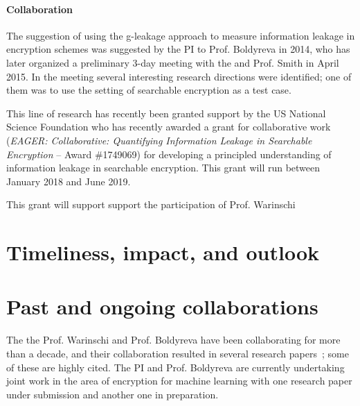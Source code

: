 \paragraph{Collaboration}
The suggestion of using the g-leakage approach to measure information leakage in encryption schemes was suggested by the PI to Prof. Boldyreva in 2014, who has later organized a preliminary 3-day meeting with the \PI and Prof. Smith in April 2015.  
In the meeting several interesting research directions were identified; one of them was to use the setting of searchable encryption as a test case. 

This line of research has recently been granted support by the US National Science Foundation who has recently awarded a grant for collaborative work (\textit{EAGER: Collaborative: Quantifying Information Leakage in Searchable Encryption} -- Award \#1749069) for developing a principled understanding of information leakage in searchable encryption. 
This grant will run between January 2018 and June 2019. 

This grant will support support the participation of Prof. Warinschi 


\section{Timeliness, impact, and outlook} 





\section{Past and ongoing collaborations}
\label{sec:prop_method}
The the Prof. Warinschi and Prof. Boldyreva have been collaborating for more than a decade, and their collaboration resulted in several research papers~\cite{boldyreva2007closer,boldyreva2009foundations,boldyreva2012secure,lipton2016provably}; some of these are  highly cited. 
The PI and Prof. Boldyreva are currently undertaking joint work in the area of encryption for machine learning with one research paper under submission and another one in preparation. 











